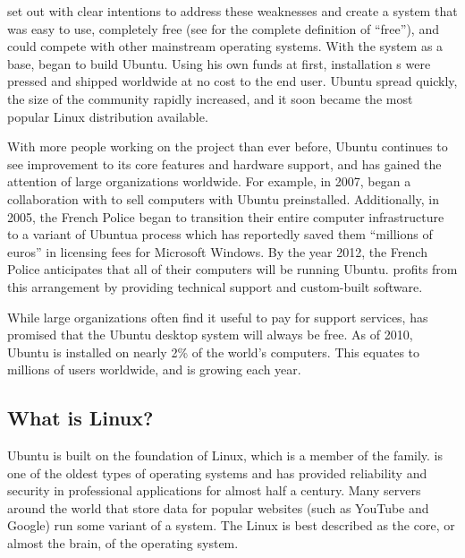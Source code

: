  set out with clear intentions to address these weaknesses and create a system
that was easy to use, completely free (see  for the complete definition of ``free''), and could compete with other mainstream operating systems. 
With the  system as a base,  began to build Ubuntu. Using his own funds at first, installation s were pressed and shipped worldwide at no cost to the end user. Ubuntu spread quickly, the size of the community rapidly increased, and it soon became the most popular Linux \gls{distribution} available. 

With more people working on the project than ever before, Ubuntu continues to see improvement to its core features and hardware support, and has gained the attention of large organizations worldwide. For example, in 2007,  began a collaboration with  to sell computers with Ubuntu preinstalled. Additionally, in 2005, the French Police began to transition their entire computer infrastructure to a variant of Ubuntu\dash a process which has reportedly saved them ``millions of euros'' in licensing fees for Microsoft Windows. By the year 2012, the French Police anticipates that all of their computers will be running Ubuntu.  profits from this arrangement by providing technical support and custom-built software.

While large organizations often find it useful to pay for support services,  has promised that the Ubuntu desktop system will always be free. As of 2010, Ubuntu is installed on nearly 2\% of the world's computers. This equates to millions of users worldwide, and is growing each year.

\subsection{What is Linux?}
Ubuntu is built on the foundation of Linux, which is a member of the  family.  is one of the oldest types of operating systems and has provided reliability and security in professional applications for almost half a century. Many servers around the world that store data for popular websites (such as YouTube and Google) run some variant of a  system. The Linux  is best described as the core, or almost the brain, of the operating system. 

